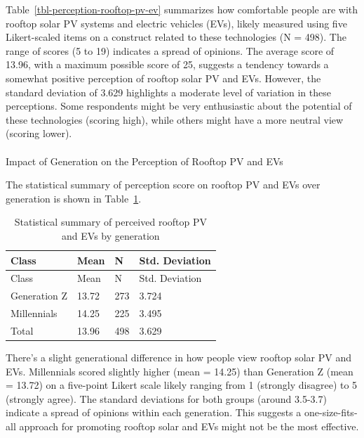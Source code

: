 \documentclass[
  letterpaper,
  DIV=11,
  numbers=noendperiod]{scrartcl}
\makeatletter
\let\oldparagraph\paragraph
\renewcommand{\paragraph}{
    \@ifstar
      \xxxParagraphStar
      \xxxParagraphNoStar
  }
\newcommand{\xxxParagraphStar}[1]{\oldparagraph*{#1}\mbox{}}
\newcommand{\xxxParagraphNoStar}[1]{\oldparagraph{#1}\mbox{}}
\makeatother
\begin{document}
Table~\ref{tbl-perception-rooftop-pv-ev} summarizes how comfortable
people are with rooftop solar PV systems and electric vehicles (EVs),
likely measured using five Likert-scaled items on a construct related to
these technologies (N = 498). The range of scores (5 to 19) indicates a
spread of opinions. The average score of 13.96, with a maximum possible
score of 25, suggests a tendency towards a somewhat positive perception
of rooftop solar PV and EVs. However, the standard deviation of 3.629
highlights a moderate level of variation in these perceptions. Some
respondents might be very enthusiastic about the potential of these
technologies (scoring high), while others might have a more neutral view
(scoring lower).

\paragraph{Impact of Generation on the Perception of Rooftop PV and
EVs}\label{impact-of-generation-on-the-perception-of-rooftop-pv-and-evs}

The statistical summary of perception score on rooftop PV and EVs over
generation is shown in Table~\ref{tbl-rooftop-pv-ev-generation}.

\begin{longtable}[]{@{}llll@{}}
\caption{Statistical summary of perceived rooftop PV and EVs by
generation}\label{tbl-rooftop-pv-ev-generation}\tabularnewline
\toprule\noalign{}
Class & Mean & N & Std. Deviation \\
\midrule\noalign{}
\endfirsthead
\toprule\noalign{}
Class & Mean & N & Std. Deviation \\
\midrule\noalign{}
\endhead
\bottomrule\noalign{}
\endlastfoot
Generation Z & 13.72 & 273 & 3.724 \\
Millennials & 14.25 & 225 & 3.495 \\
Total & 13.96 & 498 & 3.629 \\
\end{longtable}

There's a slight generational difference in how people view rooftop
solar PV and EVs. Millennials scored slightly higher (mean = 14.25) than
Generation Z (mean = 13.72) on a five-point Likert scale likely ranging
from 1 (strongly disagree) to 5 (strongly agree). The standard
deviations for both groups (around 3.5-3.7) indicate a spread of
opinions within each generation. This suggests a one-size-fits-all
approach for promoting rooftop solar and EVs might not be the most
effective.
\end{document}
